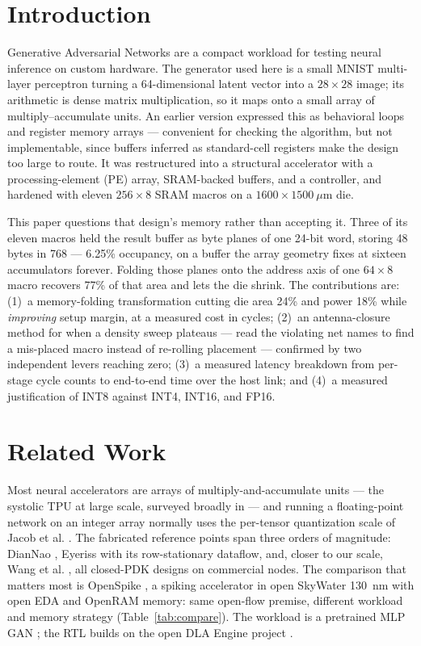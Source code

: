 \documentclass[conference,a4paper]{APSIPA2026}
\begin{document}
\section{Introduction}
Generative Adversarial Networks are a compact workload for testing neural inference on custom hardware. The generator used here is a small MNIST multi-layer perceptron turning a 64-dimensional latent vector into a $28\times28$ image; its arithmetic is dense matrix multiplication, so it maps onto a small array of multiply--accumulate units. An earlier version expressed this as behavioral loops and register memory arrays --- convenient for checking the algorithm, but not implementable, since buffers inferred as standard-cell registers make the design too large to route. It was restructured into a structural accelerator with a processing-element (PE) array, SRAM-backed buffers, and a controller, and hardened with eleven $256\times8$ SRAM macros on a $1600\times1500~\mu$m die.

This paper questions that design's memory rather than accepting it. Three of its eleven macros held the result buffer as byte planes of one 24-bit word, storing 48 bytes in 768 --- 6.25\% occupancy, on a buffer the array geometry fixes at sixteen accumulators forever. Folding those planes onto the address axis of one $64\times8$ macro recovers 77\% of that area and lets the die shrink. The contributions are: (1)~a memory-folding transformation cutting die area 24\% and power 18\% while \emph{improving} setup margin, at a measured cost in cycles; (2)~an antenna-closure method for when a density sweep plateaus --- read the violating net names to find a mis-placed macro instead of re-rolling placement --- confirmed by two independent levers reaching zero; (3)~a measured latency breakdown from per-stage cycle counts to end-to-end time over the host link; and (4)~a measured justification of INT8 against INT4, INT16, and FP16.

\section{Related Work}
Most neural accelerators are arrays of multiply-and-accumulate units --- the systolic TPU \cite{tpu} at large scale, surveyed broadly in \cite{survey} --- and running a floating-point network on an integer array normally uses the per-tensor quantization scale of Jacob et al. \cite{jacob}. The fabricated reference points span three orders of magnitude: DianNao \cite{diannao}, Eyeriss \cite{eyeriss} with its row-stationary dataflow, and, closer to our scale, Wang et al. \cite{wang}, all closed-PDK designs on commercial nodes. The comparison that matters most is OpenSpike \cite{openspike}, a spiking accelerator in open SkyWater 130~nm with open EDA and OpenRAM memory: same open-flow premise, different workload and memory strategy (Table~\ref{tab:compare}). The workload is a pretrained MLP GAN \cite{goodfellow, ganpretrained}; the RTL builds on the open DLA Engine project \cite{dlaengine}.
\end{document}
